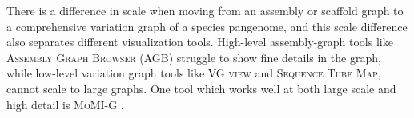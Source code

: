 There is a difference in scale when moving from an assembly or scaffold graph to a comprehensive variation graph of a species pangenome, and this scale difference also separates different visualization tools.
High-level assembly-graph tools like \textsc{Assembly Graph Browser} (\textsc{AGB}) \citep{Mikheenko_2019} struggle to show fine details in the graph, while low-level variation graph tools like \textsc{VG view} \cite{Garrison_2018} and \textsc{Sequence Tube Map}, cannot scale to large graphs.
One tool which works well at both large scale and high detail is \textsc{MoMI-G} \cite{yokoyama_momi-g:_2019}. 

